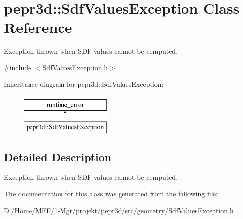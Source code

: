 \hypertarget{classpepr3d_1_1_sdf_values_exception}{}\section{pepr3d\+::Sdf\+Values\+Exception Class Reference}
\label{classpepr3d_1_1_sdf_values_exception}


Exception thrown when S\+DF values cannot be computed.  




{\ttfamily \#include $<$Sdf\+Values\+Exception.\+h$>$}

Inheritance diagram for pepr3d\+::Sdf\+Values\+Exception\+:\begin{figure}[H]
\begin{center}
\leavevmode
\includegraphics[height=2.000000cm]{classpepr3d_1_1_sdf_values_exception}
\end{center}
\end{figure}


\subsection{Detailed Description}
Exception thrown when S\+DF values cannot be computed. 

The documentation for this class was generated from the following file\+:\begin{DoxyCompactItemize}
\item 
D\+:/\+Home/\+M\+F\+F/1-\/\+Mgr/projekt/pepr3d/src/geometry/Sdf\+Values\+Exception.\+h\end{DoxyCompactItemize}
